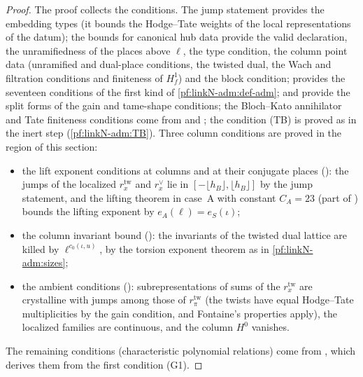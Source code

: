 \begin{proof}
The proof collects the conditions. The jump statement  provides
the embedding types (it bounds the Hodge--Tate weights of the local representations of the datum); the bounds for
canonical hub data  provide the valid declaration, the unramifiedness
of the places above $\ell$, the type condition, the column point data (unramified and dual-place conditions, the twisted
dual, the Wach and filtration conditions and finiteness of $H^1_f$) and the block condition;
 provides the seventeen conditions of the first kind of
\cref{pf:linkN-adm:def-adm};  and 
provide the split forms of the gain and tame-shape conditions; the Bloch--Kato annihilator and Tate finiteness conditions
come from  and
; the condition (TB) is proved as in the inert step
(\cref{pf:linkN-adm:TB}). Three column conditions are proved in the region of this section:
\begin{itemize}
\item the lift exponent conditions at columns and at their conjugate places
  (): the jumps of the localized $r^{\mathrm{tw}}_x$ and
  $r^\vee_x$ lie in $[-\lfloor h_B\rfloor,\lfloor h_B\rfloor]$ by the jump statement, and the lifting theorem in case~A
  with constant $C_A=23$ (part of )
  bounds the lifting exponent by $e_A(\ell)=e_S(\iota)$;
\item the column invariant bound (): the invariants of the
  twisted dual lattice are killed by $\ell^{c_0(\iota,u)}$, by the torsion exponent theorem as in
  \cref{pf:linkN-adm:sizes};
\item the ambient conditions (): subrepresentations of sums of the
  $r^{\mathrm{tw}}_x$ are crystalline with jumps among those of $r^{\mathrm{tw}}_\pi$ (the twists have equal Hodge--Tate
  multiplicities by the gain condition, and Fontaine's properties apply), the localized families are continuous, and
  the column $H^0$ vanishes.
\end{itemize}
The remaining conditions (characteristic polynomial relations) come from
, which derives them from the first condition (G1).
\end{proof}

